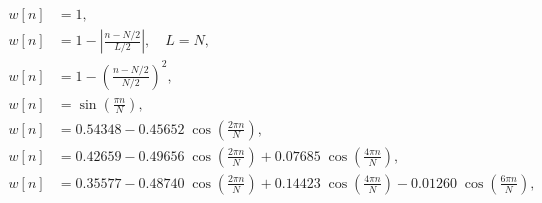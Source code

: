 \begin{align} \label{eq.filter}
  w[n] & = 1,
  \tag*{(rectangular)}                                                                                                                                        \\
  w[n] & = 1-\left|\tfrac {n-N/2}{L/2}\right|, \quad L=N,
  \tag*{(triangular/Bartlett)}                                                                                                                                \\
  w[n] & = 1-\left(\tfrac {n-N/2}{N/2}\right)^{2},
  \tag*{(Welch)}                                                                                                                                              \\
  w[n] & = \sin \left(\tfrac {\pi n}{N}\right),
  \tag*{(sine)}                                                                                                                                               \\
  w[n] & = 0.54348-0.45652\;\cos \left(\tfrac {2\pi n}{N}\right),
  \tag*{(Hamming)}                                                                                                                                            \\
  w[n] & = 0.42659-0.49656\;\cos \left(\tfrac {2\pi n}{N}\right)+0.07685\;\cos \left(\tfrac {4\pi n}{N}\right),
  \tag*{(Blackman)}                                                                                                                                           \\
  w[n] & = 0.35577-0.48740\;\cos \left(\tfrac {2\pi n}{N}\right)+0.14423\;\cos \left(\tfrac {4\pi n}{N}\right)-0.01260\;\cos \left(\tfrac {6\pi n}{N}\right),
  \tag*{(Nuttall)}                                                                                                                                            \\
\end{align}

